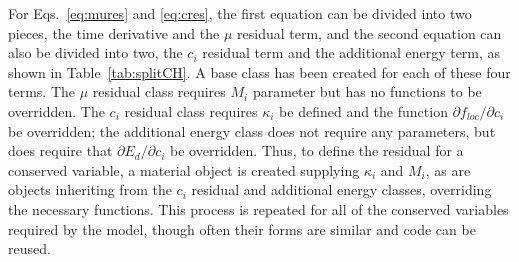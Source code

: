 \documentclass[letter,12pt,fleqn]{article}
\begin{document}
For Eqs.~\eqref{eq:mures} and \eqref{eq:cres}, the first equation  can be divided into two pieces, the time derivative and the $\mu$ residual term, and the second equation can also be divided into two, the $c_i$ residual term and the additional energy term, as shown in Table~\ref{tab:splitCH}.  A base class has been created for each of these four terms.  The $\mu$ residual class requires $M_i$ parameter but has no functions to be overridden.  The $c_i$ residual class requires $\kappa_i$ be defined and the function $\partial f_{loc} / \partial c_i$ be overridden; the additional energy class does not require any parameters, but does require that $\partial E_d / \partial c_i$ be overridden.  Thus, to define the residual for a conserved variable, a material object is created supplying $\kappa_i$ and $M_i$, as are objects inheriting from the $c_i$ residual and additional energy classes, overriding the necessary functions. This process is repeated for all of the conserved variables required by the model, though often their forms are similar and code can be reused.  
\end{document}
